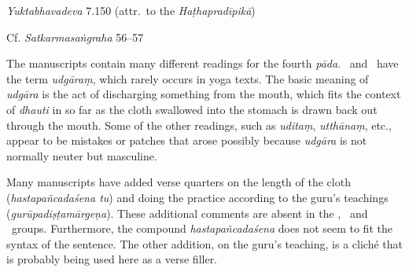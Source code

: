 \begin{ekdosis}
\begin{testimonia}[hp02_024]
\begin{versinnote}
\end{versinnote}

\emph{Yuktabhavadeva} 7.150 (attr.~to the \emph{Haṭhapradīpikā})

\begin{versinnote}
\end{versinnote}

Cf. \emph{Satkarmasaṅgraha} 56–57

\begin{versinnote}
\end{versinnote}

\end{testimonia}

\begin{philcomm}[hp02_024]
The manuscripts contain many different readings for the fourth \emph{pāda}. \alphaThree\ and \etaOne\ have the term \emph{udgāraṃ}, which rarely occurs in yoga texts. The basic meaning of \emph{udgāra} is the act of discharging something from the mouth, which fits the context of \emph{dhauti} in so far as the cloth swallowed into the stomach is drawn back out through the mouth. Some of the other readings, such as \emph{uditaṃ}, \emph{utthānaṃ}, etc., appear to be mistakes or patches that arose possibly because \emph{udgāra} is not normally neuter but masculine.

Many manuscripts have added verse quarters on the length of the cloth (\emph{hastapañcadaśena tu}) and doing the practice according to the guru’s teachings (\emph{gurūpadiṣṭa\-mārgeṇa}). These additional comments are absent in the \textalpha, \textgamma\ and \textepsilon\ groups. Furthermore, the compound \emph{hastapañcadaśena} does not seem to fit the syntax of the sentence. The other addition, on the guru's teaching, is a cliché that is probably being used here as a verse filler.
\end{philcomm}



\end{ekdosis}

